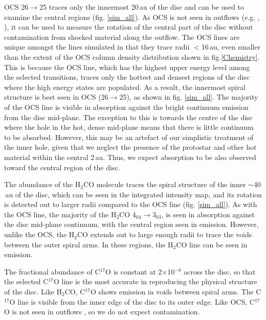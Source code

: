 \documentclass[useAMS,usenatbib]{mn2e}
\begin{document}
OCS 26$\rightarrow$25 traces only the innermost 20$\,$au of the disc and can be used to examine the central regions (fig. \ref{sim_all}). As OCS is not seen in outflows (e.g. \citealt{Stanke2007}, \citealt{VDTak2003}), it can be used to measure the rotation of the central part of the disc without contamination from shocked material along the outflow. The OCS lines are unique amongst the lines simulated in that they trace radii $<$16$\,$au, even smaller than the extent of the OCS column density distribution shown in fig.\ref{Chemistry}. This is because the OCS line, which has the highest upper energy level among the selected transitions, traces only the hottest and densest regions of the disc where the high energy states are populated. As a result, the innermost spiral structure is best seen in OCS (26$\rightarrow$25), as shown in fig. \ref{sim_all}. The majority of the OCS line is visible in absorption against the bright continuum emission from the disc mid-plane. The exception to this is towards the centre of the disc where the hole in the hot, dense mid-plane means that there is little continuum to be absorbed. However, this may be an artefact of our simplistic treatment of the inner hole, given that we neglect the presence of the protostar and other hot material within the central 2$\,$au. Thus, we expect absorption to be also observed toward the central region of the disc.\smallskip

The abundance of the H$_2$CO molecule traces the spiral structure of the inner $\sim$40$\,$au of the disc, which can be seen in the integrated intensity map, and its rotation is detected out to larger radii compared to the OCS line (fig. \ref{sim_all}). As with the OCS line, the majority of the H$_2$CO 4$_{04}$$\rightarrow$3$_{03}$, is seen in absorption against the disc mid-plane continuum, with the central region seen in emission. However, unlike the OCS, the H$_2$CO extends out to large enough radii to trace the voids between the outer spiral arms. In these regions, the H$_2$CO line can be seen in emission.\smallskip

The fractional abundance of C$^{17}$O is constant at 2$\times$10$^{-8}$ across the disc, so that the selected C$^{17}$O line is the most accurate in reproducing the physical structure of the disc. Like H$_2$CO, C$^{17}$O shows emission in voids between spiral arms. The C$^{17}$O line is visible from the inner edge of the disc to its outer edge. Like OCS, C$^{17}$O is not seen in outflows \citep{Yildiz2012}, so we do not expect contamination.\smallskip
\end{document}
